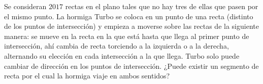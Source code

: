 Se consideran $2017$ rectas en el plano tales que no hay tres de ellas que pasen por
el mismo punto. La hormiga Turbo se coloca en un punto de una recta (distinto de los puntos de
intersección) y empieza a moverse sobre las rectas de la siguiente manera: se mueve en la recta en la
que está hasta que llega al primer punto de intersección, ahí cambia de recta torciendo a la izquierda
o a la derecha, alternando su elección en cada intersección a la que llega. Turbo solo puede cambiar
de dirección en los puntos de intersección. ¿Puede existir un segmento de recta por el cual la hormiga
viaje en ambos sentidos?